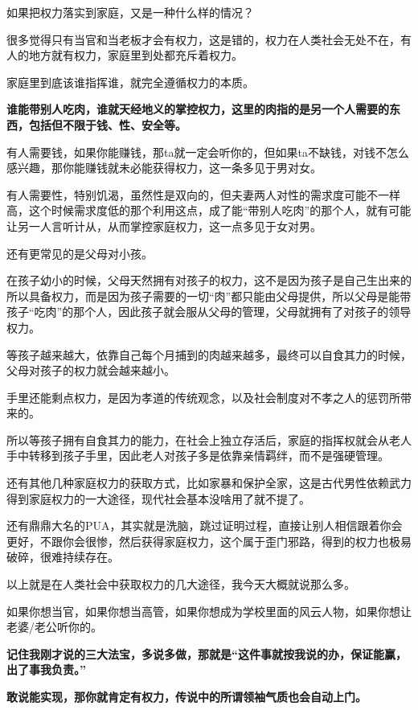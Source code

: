 \documentclass[UTF8, 11pt, oneside]{ctexart}
\newcommand{\zd}[1]{\textbf{\textcolor[RGB]{123,12,0}{#1}}} %
\begin{document}
如果把权力落实到家庭，又是一种什么样的情况？

很多觉得只有当官和当老板才会有权力，这是错的，权力在人类社会无处不在，有人的地方就有权力，家庭里到处都充斥着权力。

家庭里到底该谁指挥谁，就完全遵循权力的本质。

\zd{谁能带别人吃肉，谁就天经地义的掌控权力，这里的肉指的是另一个人需要的东西，包括但不限于钱、性、安全等。}

有人需要钱，如果你能赚钱，那ta就一定会听你的，但如果ta不缺钱，对钱不怎么感兴趣，那你能赚钱就未必能获得权力，这一条多见于男对女。

有人需要性，特别饥渴，虽然性是双向的，但夫妻两人对性的需求度可能不一样高，这个时候需求度低的那个利用这点，成了能“带别人吃肉”的那个人，就有可能让另一人言听计从，从而掌控家庭权力，这一点多见于女对男。

还有更常见的是父母对小孩。

在孩子幼小的时候，父母天然拥有对孩子的权力，这不是因为孩子是自己生出来的所以具备权力，而是因为孩子需要的一切“肉”都只能由父母提供，所以父母是能带孩子“吃肉”的那个人，因此孩子就会服从父母的管理，父母就拥有了对孩子的领导权力。

等孩子越来越大，依靠自己每个月捕到的肉越来越多，最终可以自食其力的时候，父母对孩子的权力就会越来越小。

手里还能剩点权力，是因为孝道的传统观念，以及社会制度对不孝之人的惩罚所带来的。

所以等孩子拥有自食其力的能力，在社会上独立存活后，家庭的指挥权就会从老人手中转移到孩子手里，因此老人对孩子多是依靠亲情羁绊，而不是强硬管理。

还有其他几种家庭权力的获取方式，比如家暴和保护全家，这是古代男性依赖武力得到家庭权力的一大途径，现代社会基本没啥用了就不提了。

还有鼎鼎大名的PUA，其实就是洗脑，跳过证明过程，直接让别人相信跟着你会更好，不跟你会很惨，然后获得家庭权力，这个属于歪门邪路，得到的权力也极易破碎，很难持续存在。

以上就是在人类社会中获取权力的几大途径，我今天大概就说那么多。

如果你想当官，如果你想当高管，如果你想成为学校里面的风云人物，如果你想让老婆/老公听你的。

\zd{记住我刚才说的三大法宝，多说多做，那就是“这件事就按我说的办，保证能赢，出了事我负责。”}

\zd{敢说能实现，那你就肯定有权力，传说中的所谓领袖气质也会自动上门。}
\end{document}
